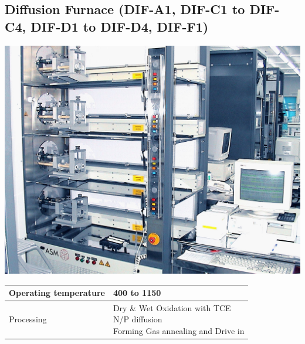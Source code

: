 \subsection{Diffusion Furnace (DIF-A1, DIF-C1 to DIF-C4, DIF-D1 to DIF-D4, DIF-F1)}\label{diffusion_furnace_machine}
\WaferClean\WaferSemiClean\WaferNonStandard

\begin{minipage}[H]{\MachinePictureMiniPageWidth}
	\includegraphics[width=\MachinePictureWidth]{pictures_machines/diffusion_furnace.png}
\end{minipage}\begin{minipage}[H]{\MachineTextMiniPageWidth}
	\begin{tabular}{|p{2cm}|p{8cm}|}
		\hline
		Operating temperature &
		400 to 1150 \degreesC \\
		\hline
		Processing &
		\makecell[l]{
			\tabitem Dry \& Wet Oxidation with TCE\\
			\tabitem N/P diffusion \\
			\tabitem Forming Gas annealing and Drive in
		} \\
		\hline
	\end{tabular}
\end{minipage}